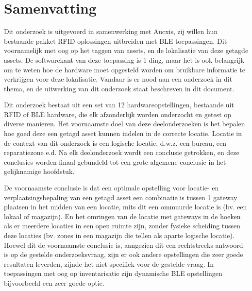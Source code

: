
%


\chapter{Samenvatting}

Dit onderzoek is uitgevoerd in samenwerking met Aucxis, zij willen hun bestaande pakket RFID oplossingen uitbreiden met BLE toepassingen. Dit voornamelijk met oog op het taggen van assets, en de lokalisatie van deze getagde assets. De softwarekant van deze toepassing is 1 ding, maar het is ook belangrijk om te weten hoe de hardware moet opgesteld worden om bruikbare informatie te verkrijgen voor deze lokalisatie. Vandaar is er nood aan een onderzoek in dit thema, en de uitwerking van dit onderzoek staat beschreven in dit document. 

Dit onderzoek bestaat uit een set van 12 hardwareopstellingen, bestaande uit RFID of BLE hardware, die elk afzonderlijk worden onderzocht en getest op diverse manieren. Het voornaamste doel van deze deelonderzoeken is het bepalen hoe goed deze een getagd asset kunnen indelen in de correcte locatie. Locatie in de context van dit onderzoek is een logische locatie, d.w.z. een bureau, een reparatiezone e.d. Na elk deelonderzoek wordt een conclusie getrokken, en deze conclusies worden finaal gebundeld tot een grote algemene conclusie in het gelijknamige hoofdstuk. 

De voornaamste conclusie is dat een optimale opstelling voor locatie- en verplaatsingsbepaling van een getagd asset een combinatie is tussen 1 gateway plaatsen in het midden van een locatie, mits dit een ommuurde locatie is (bv. een lokaal of magazijn). En het omringen van de locatie met gateways in de hoeken als er meerdere locaties in een open ruimte zijn, zonder fysieke scheiding tussen deze locaties (bv. zones in een magazijn die tellen als aparte logische locatie). 
Hoewel dit de voornaamste conclusie is, aangezien dit een rechtstreeks antwoord is op de gestelde onderzoeksvraag, zijn er ook andere opstellingen die zeer goede resultaten leverden, zijnde het niet specifiek voor de gestelde vraag. In toepassingen met oog op inventarisatie zijn dynamische BLE opstellingen bijvoorbeeld een zeer goede optie.

